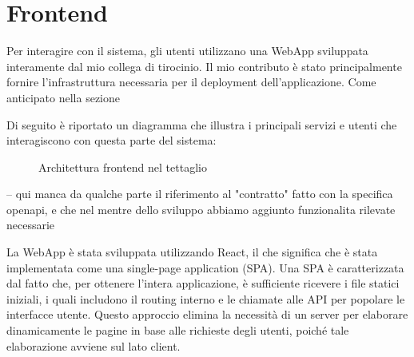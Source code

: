 \section{Frontend}

Per interagire con il sistema, gli utenti utilizzano una WebApp sviluppata interamente dal mio collega di tirocinio. Il mio contributo è stato principalmente fornire l'infrastruttura necessaria per il deployment dell'applicazione. 
Come anticipato nella sezione

Di seguito è riportato un diagramma che illustra i principali servizi e utenti che interagiscono con questa parte del sistema:

\begin{figure}[ht]  
    \centering
    \caption{Architettura frontend nel tettaglio}
    \label{imm:infra_frontend}
\end{figure}

\FloatBarrier

-- qui manca da qualche parte il riferimento al "contratto" fatto con la specifica openapi, e che nel mentre dello sviluppo abbiamo aggiunto funzionalita rilevate necessarie

La WebApp è stata sviluppata utilizzando React, il che significa che è stata implementata come una single-page application (SPA). Una SPA è caratterizzata dal fatto che, per ottenere l'intera applicazione, è sufficiente ricevere i file statici iniziali, i quali includono il routing interno e le chiamate alle API per popolare le interfacce utente. Questo approccio elimina la necessità di un server per elaborare dinamicamente le pagine in base alle richieste degli utenti, poiché tale elaborazione avviene sul lato client.

